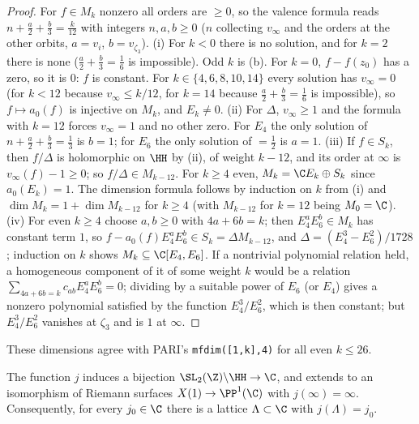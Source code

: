 \begin{proof}
For $f\in M_k$ nonzero all orders are $\ge0$, so the valence formula reads $n+\frac a2+\frac b3=\frac k{12}$ with integers $n,a,b\ge0$ ($n$ collecting $v_\infty$ and the orders at
the other orbits, $a=v_i$, $b=v_{\zeta_3}$). (i) For $k<0$ there is no solution, and for $k=2$ there is none ($\frac a2+\frac b3=\frac16$ is impossible). Odd $k$ is
(b). For $k=0$, $f-f(z_0)$ has a zero, so it is $0$: $f$ is constant. For $k\in\{4,6,8,10,14\}$ every solution has $v_\infty=0$ (for $k<12$
because $v_\infty\le k/12$, for $k=14$ because $\frac a2+\frac b3=\frac16$ is impossible), so $f\mapsto a_0(f)$ is injective on $M_k$, and $E_k\ne0$.
(ii) For $\Delta$, $v_\infty\ge1$ and the formula with $k=12$ forces $v_\infty=1$ and no other zero. For $E_4$ the only solution of $n+\frac a2+\frac b3=\frac13$ is $b=1$; for $E_6$
the only solution of $=\frac12$ is $a=1$.
(iii) If $f\in S_k$, then $f/\Delta$ is holomorphic on $\HH$ by (ii), of weight $k-12$, and its order at $\infty$ is $v_\infty(f)-1\ge0$; so $f/\Delta\in M_{k-12}$. For $k\ge4$ even,
$M_k=\C E_k\oplus S_k$ since $a_0(E_k)=1$. The dimension formula follows by induction on $k$ from (i) and $\dim M_k=1+\dim M_{k-12}$ for $k\ge4$ (with $M_{k-12}$ for $k=12$ being
$M_0=\C$).
(iv) For even $k\ge4$ choose $a,b\ge0$ with $4a+6b=k$; then $E_4^aE_6^b\in M_k$ has constant term $1$, so $f-a_0(f)E_4^aE_6^b\in S_k=\Delta M_{k-12}$, and
$\Delta=(E_4^3-E_6^2)/1728$; induction on $k$ shows $M_k\subseteq\C[E_4,E_6]$. If a nontrivial polynomial relation held, a homogeneous component of it of some weight $k$ would
be a relation $\sum_{4a+6b=k}c_{ab}E_4^aE_6^b=0$; dividing by a suitable power of $E_6$ (or $E_4$) gives a nonzero polynomial satisfied by the function $E_4^3/E_6^2$, which is
then constant; but $E_4^3/E_6^2$ vanishes at $\zeta_3$ and is $1$ at $\infty$.
\end{proof}

These dimensions agree with PARI's \texttt{mfdim([1,k],4)} for all even $k\le26$.

\begin{theorem}[$j$ is a bijection]\label{thm:modforms:j-bijective}
The function $j$ induces a bijection $\SL_2(\Z)\backslash\HH\to\C$, and extends to an isomorphism of Riemann surfaces $X(1)\to\PP^1(\C)$ with $j(\infty)=\infty$. Consequently, for every
$j_0\in\C$ there is a lattice $\Lambda\subset\C$ with $j(\Lambda)=j_0$.
\end{theorem}

